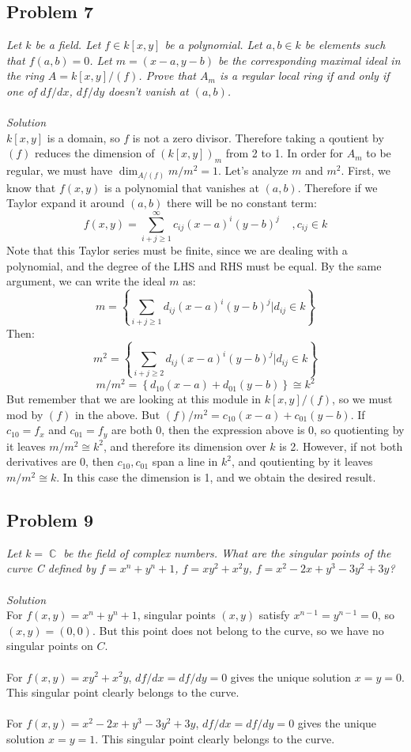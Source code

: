 \documentclass[12 pt]{article}
\DeclareMathOperator {\C} {\mathbb{C}}
\begin{document}
\subsection*{Problem 7}
\emph{Let $k$ be a field. Let $f \in k[x, y]$ be a polynomial. Let $a, b \in k$ be elements such that $f(a, b) = 0$. Let $m = (x - a, y - b)$ be the corresponding maximal ideal in the ring $A = k[x, y]/(f)$. Prove that $A_m$ is a regular local ring if and only if one of $df/dx$, $df/dy$ doesn't vanish at $(a, b)$.}
\\
\\
\emph{Solution}
\\
$k[x,y]$ is a domain, so $f$ is not a zero divisor. Therefore taking a qoutient by $(f)$ reduces the dimension of $(k[x,y])_m$ from 2 to 1. In order for $A_m$ to be regular, we must have $\dim_{A/(f)} m/m^2 = 1$. Let's analyze $m$ and $m^2$. First, we know that $f(x,y)$ is a polynomial that vanishes at $(a,b)$. Therefore if we Taylor expand it around $(a,b)$ there will be no constant term:
\[     f(x,y) = \sum_{i+j\geq 1}^{\infty} c_{ij} (x-a)^i (y-b)^j \;\;\;\;, c_{ij} \in k   \]
Note that this Taylor series must be finite, since we are dealing with a polynomial, and the degree of the LHS and RHS must be equal. By the same argument, we can write the ideal $m$ as:
\[     m = \left\{ \sum_{i+j\geq 1} d_{ij} (x-a)^i (y-b)^j | d_{ij} \in k  \right\} \]
Then:
\[      m^2 = \left\{ \sum_{i+j\geq 2} d_{ij} (x-a)^i (y-b)^j | d_{ij} \in k  \right\}   \]
\[    m/m^2 = \left\{ d_{10} (x-a) + d_{01} (y-b)  \right\}  \cong k^2  \]
But remember that we are looking at this module in $k[x,y]/(f)$, so we must mod by $(f)$ in the above. But $(f)/m^2 = c_{10}(x-a) + c_{01} (y-b)$. If $c_{10} = f_x$ and $c_{01} = f_y$ are both 0, then the expression above is 0, so quotienting by it leaves $m/m^2 \cong k^2$, and therefore its dimension over $k$ is 2. However, if not both derivatives are 0, then $c_{10}, c_{01}$ span a line in $k^2$, and qoutienting by it leaves $m/m^2 \cong k$. In this case the dimension is 1, and we obtain the desired result.

\subsection*{Problem 9}
\emph{Let $k = \C$ be the field of complex numbers. What are the singular points of the curve C defined by $f = x^n + y^n + 1$, $f = xy^2 + x^2y$, $f = x^2 - 2x + y^3 - 3y^2 +3y$?}
\\
\\
\emph{Solution}
\\
For $f(x,y) = x^n + y^n + 1$, singular points $(x,y)$ satisfy $x^{n-1} = y^{n-1} = 0$, so $(x,y) = (0,0)$. But this point does not belong to the curve, so we have no singular points on $C$.
\\
\\
For $f(x,y) = xy^2 + x^2y$, $df/dx = df/dy = 0$ gives the unique solution $x=y=0$. This singular point clearly belongs to the curve.
\\
\\
For $f(x,y) = x^2 - 2x + y^3 - 3y^2 + 3y$, $df/dx = df/dy = 0$ gives the unique solution $x=y=1$. This singular point clearly belongs to the curve.
\end{document}
